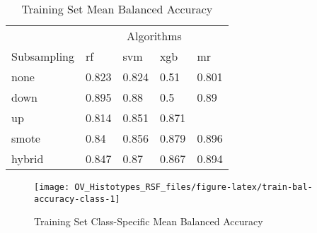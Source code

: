 \documentclass[
]{report}
\begin{document}
\begin{table}

\caption{\label{tab:train-bal-accuracy-table}Training Set Mean Balanced Accuracy}
\centering
\begin{tabular}[t]{l|l|l|l|l}
\hline
\multicolumn{1}{c|}{ } & \multicolumn{4}{c}{Algorithms} \\
\cline{2-5}
Subsampling & rf & svm & xgb & mr\\
\hline
none & 0.823 & 0.824 & 0.51 & 0.801\\
\hline
down & 0.895 & 0.88 & 0.5 & 0.89\\
\hline
up & 0.814 & 0.851 & 0.871 & \cellcolor[HTML]{90ee90}{0.897}\\
\hline
smote & 0.84 & 0.856 & 0.879 & 0.896\\
\hline
hybrid & 0.847 & 0.87 & 0.867 & 0.894\\
\hline
\end{tabular}
\end{table}

\begin{figure}[H]

{\centering \texttt{[image: OV\_Histotypes\_RSF\_files/figure-latex/train-bal-accuracy-class-1]} 

}

\caption{Training Set Class-Specific Mean Balanced Accuracy}\label{fig:train-bal-accuracy-class}
\end{figure}
\end{document}
